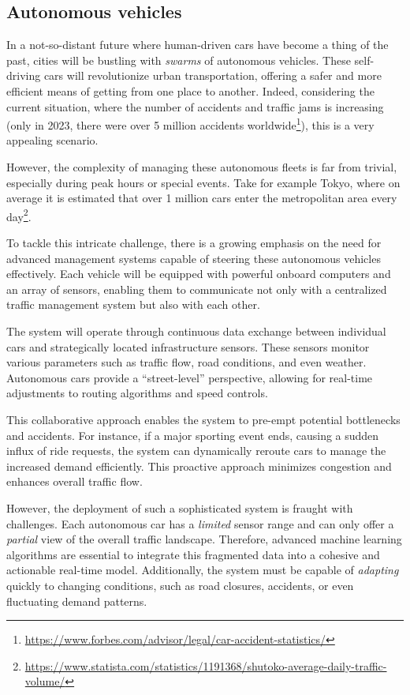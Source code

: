 \subsection{Autonomous vehicles}
In a not-so-distant future
 where human-driven cars have become a thing of the past, 
 cities will be bustling with \emph{swarms} of autonomous vehicles. 
% 
These self-driving cars will revolutionize urban transportation, 
 offering a safer and more efficient means of getting from one place to another. 
Indeed, considering the current situation, 
 where the number of accidents and traffic jams is increasing (only in 2023, there were over 5 million accidents worldwide\footnote{\url{https://www.forbes.com/advisor/legal/car-accident-statistics/}}), 
 this is a very appealing scenario.

However, the complexity of managing these autonomous fleets is far from trivial, 
 especially during peak hours or special events. 
%
Take for example Tokyo,
 where on average it is estimated that
 over 1 million cars enter the metropolitan area every day\footnote{\url{https://www.statista.com/statistics/1191368/shutoko-average-daily-traffic-volume/}}.

To tackle this intricate challenge, 
 there is a growing emphasis on the need for advanced management systems capable 
 of steering these autonomous vehicles effectively. 
 Each vehicle will be equipped with powerful onboard computers 
 and an array of sensors, 
 enabling them to communicate not only with a centralized traffic management system 
 but also with each other.

The system will operate through continuous data 
 exchange between individual cars 
 and strategically located infrastructure sensors. 
 These sensors monitor various parameters such as traffic flow, 
 road conditions, and even weather. 
 Autonomous cars provide a ``street-level'' perspective, 
 allowing for real-time adjustments to routing algorithms 
 and speed controls.

This collaborative approach enables the system to pre-empt potential bottlenecks and accidents. 
 For instance, if a major sporting event ends, 
 causing a sudden influx of ride requests, 
 the system can dynamically reroute cars to manage the increased demand efficiently. 
 This proactive approach minimizes congestion and enhances overall traffic flow.

However, the deployment of such a sophisticated system is fraught with challenges. 
 Each autonomous car has a \emph{limited} sensor range and can only offer a \emph{partial} view of the overall traffic landscape. 
 Therefore, advanced machine learning algorithms are essential to integrate this fragmented data into a cohesive and actionable real-time model. 
 Additionally, the system must be capable of \emph{adapting} quickly to changing conditions, such as road closures, accidents, or even fluctuating demand patterns.

